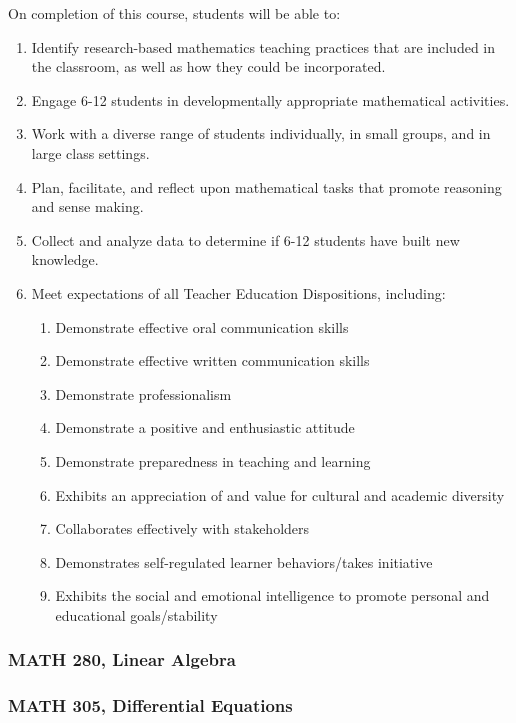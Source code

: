 \documentclass[11pt]{article}
\newenvironment{alphalist}{
\begin{enumerate}[label=(\arabic*),widest=107 ,leftmargin=25pt, itemsep=0pt]}
{\end{enumerate}}
\newenvironment{betalist}{
\begin{enumerate}[label=(\alph*),widest=zzz,leftmargin=25pt,itemsep=0pt]}
{\end{enumerate}}
\begin{document}
On completion of this course, students will be able to:
\begin{alphalist}
\item Identify research-based mathematics teaching practices that are included in the classroom, as well as how they could be incorporated.
\item Engage 6-12 students in developmentally appropriate mathematical activities. 
\item Work with a diverse range of students individually, in small groups, and in large class settings.
\item Plan, facilitate, and reflect upon mathematical tasks that promote reasoning and sense making.
\item Collect and analyze data to determine if 6-12 students have built new knowledge.
\item Meet expectations of all Teacher Education Dispositions, including:
\begin{betalist}
    \item Demonstrate effective oral communication skills
    \item Demonstrate effective written communication skills
    \item Demonstrate professionalism
    \item Demonstrate a positive and enthusiastic attitude
    \item Demonstrate preparedness in teaching and learning
    \item Exhibits an appreciation of and value for cultural and academic diversity
    \item Collaborates effectively with stakeholders
    \item Demonstrates self-regulated learner behaviors/takes initiative
    \item Exhibits the social and emotional intelligence to promote personal and educational goals/stability
\end{betalist}
\end{alphalist}

\subsubsection*{MATH 280, Linear Algebra}



\subsubsection*{MATH 305, Differential Equations}
\end{document}
